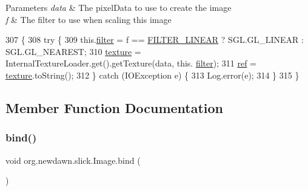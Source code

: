\begin{DoxyParams}{Parameters}
{\em data} & The pixel\+Data to use to create the image \\
\hline
{\em f} & The filter to use when scaling this image \\
\hline
\end{DoxyParams}

\begin{DoxyCode}
307                                         \{
308         \textcolor{keywordflow}{try} \{
309             this.\mbox{\hyperlink{classorg_1_1newdawn_1_1slick_1_1_image_a1c6f09687817420f3762f32bb1c3ed76}{filter}} = f == \mbox{\hyperlink{classorg_1_1newdawn_1_1slick_1_1_image_ad3ba5404a81c4fad40140cbd517fae3d}{FILTER\_LINEAR}} ? SGL.GL\_LINEAR : SGL.GL\_NEAREST;
310             \mbox{\hyperlink{classorg_1_1newdawn_1_1slick_1_1_image_a9fd9ddb21247305c83ac4e37d9d51f79}{texture}} = InternalTextureLoader.get().getTexture(data, this.
      \mbox{\hyperlink{classorg_1_1newdawn_1_1slick_1_1_image_a1c6f09687817420f3762f32bb1c3ed76}{filter}});
311             \mbox{\hyperlink{classorg_1_1newdawn_1_1slick_1_1_image_a32694687591a80299d8b8ad1ea070cee}{ref}} = \mbox{\hyperlink{classorg_1_1newdawn_1_1slick_1_1_image_a9fd9ddb21247305c83ac4e37d9d51f79}{texture}}.toString();
312         \} \textcolor{keywordflow}{catch} (IOException e) \{
313             Log.error(e);
314         \}
315     \}
\end{DoxyCode}


\subsection{Member Function Documentation}
\mbox{\label{classorg_1_1newdawn_1_1slick_1_1_image_ad5e41640d7b1b235926f3d248935e694}} 
\subsubsection{\texorpdfstring{bind()}{bind()}}
{\footnotesize\ttfamily void org.\+newdawn.\+slick.\+Image.\+bind (\begin{DoxyParamCaption}{ }\end{DoxyParamCaption})\hspace{0.3cm}{\ttfamily [inline]}}

